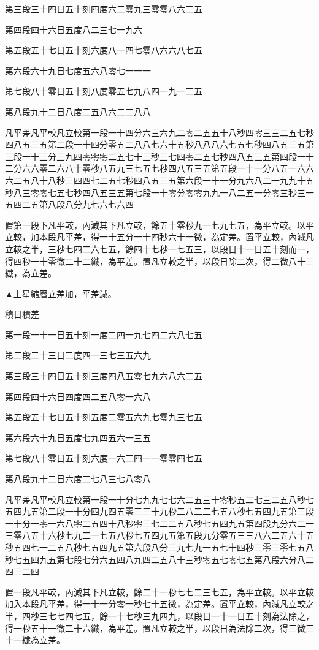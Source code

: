 第三段三十四日五十刻四度六二零九三零零八六二五

第四段四十六日五度八二三七一九六

第五段五十七日五十刻六度八一四七零八六六八七五

第六段六十九日七度五六八零七一一一

第七段八十零日五十刻八度零五七九八四一九一二五

第八段九十二日八度二五八六二二八八

凡平差凡平較凡立較第一段一十四分六三六九二零二五五十八秒四零三三二五七秒四八五三五第二段一十四分零五二八八七六十五秒八八八六七五七秒四八五三五第三段一十三分三九四零零零二五七十三秒三七四零二五七秒四八五三五第四段一十二分六六零二六八十零秒八五九三七五七秒四八五三五第五段一十一分八五一六六六二五八十八秒三四四七二五七秒四八五三五第六段一十一分九六八二一九九十五秒八三零零七五七秒四八五三五第七段一十零分零零九九一八二五一分零三秒三一五四二五第八段八分九七六七六四

置第一段下凡平較，內減其下凡立較，餘五十零秒九一七九七五，為平立較。以平立較，加本段凡平差，得一十五分一十四秒六十一微，為定差。置平立較，內減凡立較之半，三秒七四二六七五，餘四十七秒一七五三，以段日十一日五十刻而一，得四秒一十零微二十二纖，為平差。置凡立較之半，以段日除二次，得二微八十三纖，為立差。

▲土星縮曆立差加，平差減。

積日積差

第一段一十一日五十刻一度二四一九七四二六八七五

第二段二十三日二度四一三七三五六九

第三段三十四日五十刻三度四八五零七九六八六二五

第四段四十六日四度四二五八零一六八

第五段五十七日五十刻五度二零五六九七零九三七五

第六段六十九日五度七九四五六一三五

第七段八十零日五十刻六度一六二四一一零零四七五

第八段九十二日六度二七八三七八零八

凡平差凡平較凡立較第一段一十分七九九七七六二五三十零秒五二七三二五八秒七五四九五第二段一十分四九四五零三三十九秒二八二二七五八秒七五四九五第三段一十分一零一六八零二五四十八秒零三七二二五八秒七五四九五第四段九分六二一三零八五十六秒七九二一七五八秒七五四九五第五段九分零五三三八六二五六十五秒五四七一二五八秒七五四九五第六段八分三九七九一五七十四秒三零三零七五八秒七五四九五第七段七分六五四八九四二五八十三秒零五七零七五第八段六分八二四三二四

置一段凡平較，內減其下凡立較，餘二十一秒七七二三七五，為平立較。以平立較加入本段凡平差，得一十一分零一秒七十五微，為定差。置平立較，內減凡立較之半，四秒三七七四七五，餘一十七秒三九四九，以段日一十一日五十刻為法除之，得一秒五十一微二十六纖，為平差。置凡立較之半，以段日為法除二次，得三微三十一纖為立差。

